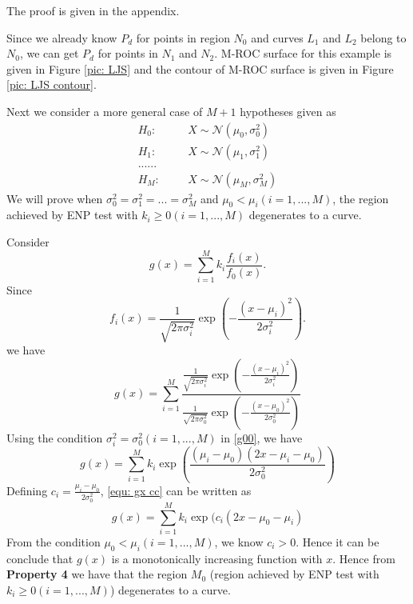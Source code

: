 \documentclass[12pt,journal,a4paper,twoside,onecolumn]{IEEEtran}
\begin{document}
\begin{spacing}{2.5}
The proof is given in the appendix.

Since we already know $P_d$ for points in region $N_0$ and curves $L_1$ and $L_2$ belong to $N_0$, we can get $P_d$ for points in $N_1$ and $N_2$. M-ROC surface for this example is given in Figure  \ref{pic: LJS} and the contour of M-ROC surface is given in Figure \ref{pic: LJS contour}.

Next we consider a more general case of $M+1$ hypotheses given as
\begin{equation}
\label{equ: m+1 Gaussian Hypo}
\begin{split}
H_0:\;\;\;\;\;\;&X\sim \mathcal{N}(\mu_0, \sigma_0^2)\\
H_1:\;\;\;\;\;\;&X\sim \mathcal{N}(\mu_1, \sigma_1^2)\\
  ......\\
H_M:\;\;\;\;\;\;&X\sim \mathcal{N}(\mu_M, \sigma_M^2)
\end{split}
\end{equation}
We will prove when $\sigma_0^2 = \sigma_1^2 = ... = \sigma_M^2$ and $\mu_0 < \mu_i (i = 1, ..., M)$, the region achieved by ENP test with $k_i \geq 0 (i = 1, ..., M)$ degenerates to a curve.

Consider
\begin{equation}
\label{equ: define gx}
g(x) = \sum_{i=1}^{M}k_i\frac{f_i(x)}{f_0(x)}.
\end{equation}
Since 
\begin{equation}
\label{equ: gaussian PDF}
f_i(x) = \frac{1}{\sqrt{2\pi\sigma_i^2}}\exp(-\frac{(x-\mu_i)^2}{2\sigma_i^2}).
\end{equation}
we have
\begin{equation}
\label{g00}
g(x) = \sum_{i=1}^{M}\frac{\frac{1}{\sqrt{2\pi\sigma_i^2}}\exp(-\frac{(x-\mu_i)^2}{2\sigma_i^2})}{\frac{1}{\sqrt{2\pi\sigma_0^2}}\exp(-\frac{(x-\mu_0)^2}{2\sigma_0^2})}
\end{equation}
Using the condition $\sigma_i^2 = \sigma_0^2 (i = 1, ..., M)$ in \eqref{g00}, we have 
\begin{equation}
\label{equ: gx cc}
g(x) = \sum_{i=1}^{M}k_i\exp(\frac{(\mu_i - \mu_0)(2x-\mu_i - \mu_0)}{2\sigma_0^2})
\end{equation}
Defining $c_i = \frac{\mu_i - \mu_0}{2\sigma_0^2}$, \eqref{equ: gx cc} can be written as
\begin{equation}
g(x) = \sum_{i=1}^{M}k_i\exp(c_i(2x-\mu_0 - \mu_i)
\end{equation}
From the condition $\mu_0 < \mu_i (i=1, ..., M)$, we know $c_i >0$. Hence it can be conclude that $g(x)$ is a monotonically increasing function with $x$. Hence from \textbf{Property 4} we have that the region $M_0$ (region achieved by ENP test with $k_i \geq 0 (i=1, ..., M)$) degenerates to a curve.


\end{spacing}
\end{document}
